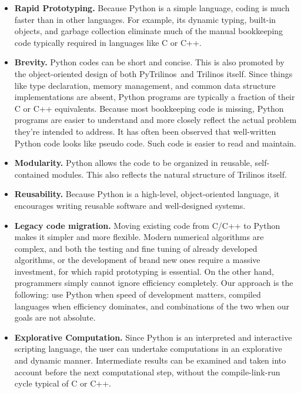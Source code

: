 \documentclass[10pt,relax]{SANDreport}
\newcommand{\PyTrilinos}{{PyTrilinos}}
\begin{document}
\begin{itemize}

\item {\bf Rapid Prototyping.}  Because Python is a simple language,
  coding is much faster than in other languages. For example, its
  dynamic typing, built-in objects, and garbage collection eliminate
  much of the manual bookkeeping code typically required in languages
  like C or C++.

\item {\bf Brevity.} Python codes can be short and concise. This is
  also promoted by the object-oriented design of both \PyTrilinos\ and
  Trilinos itself.  Since things like type declaration, memory
  management, and common data structure implementations are absent,
  Python programs are typically a fraction of their C or C++
  equivalents.  Because most bookkeeping code is missing, Python
  programs are easier to understand and more closely reflect the
  actual problem they're intended to address.  It has often been
  observed that well-written Python code looks like pseudo code.  Such
  code is easier to read and maintain.

\item {\bf Modularity.} Python allows the code to be organized in
  reusable, self-contained modules.  This also reflects the natural
  structure of Trilinos itself.

\item {\bf Reusability.} Because Python is a high-level,
  object-oriented language, it encourages writing reusable software
  and well-designed systems.

\item {\bf Legacy code migration.} Moving existing code from C/C++ to
  Python makes it simpler and more flexible.  Modern numerical
  algorithms are complex, and both the testing and fine tuning of
  already developed algorithms, or the development of brand new ones
  require a massive investment, for which rapid prototyping is
  essential. On the other hand, programmers simply cannot ignore
  efficiency completely. Our approach is the following: use Python
  when speed of development matters, compiled languages when
  efficiency dominates, and combinations of the two when our goals are
  not absolute.

\item {\bf Explorative Computation.} Since Python is an interpreted
  and interactive scripting language, the user can undertake
  computations in an explorative and dynamic manner. Intermediate
  results can be examined and taken into account before the next
  computational step, without the compile-link-run cycle typical of C
  or C++.


\end{itemize}
\end{document}
